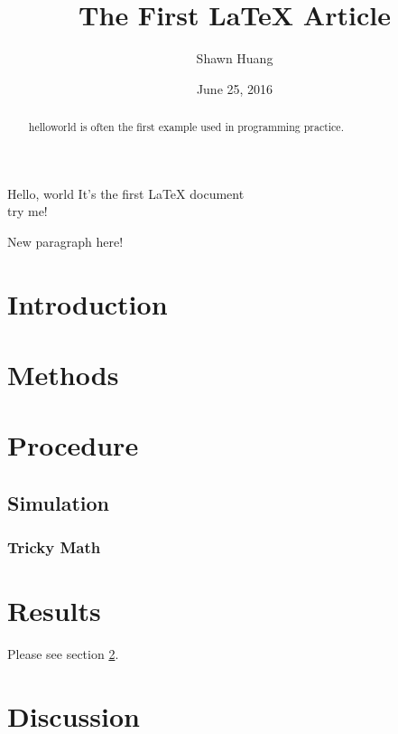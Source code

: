 \documentclass{article} %
\author{Shawn Huang}
\title{The First LaTeX Article}
\date{June 25, 2016}
\begin{document}
\maketitle %
\newpage %


\begin{abstract}
helloworld is often the first example used in programming practice.
\end{abstract}


Hello, world
It's the first LaTeX document\\              %
try me!

New paragraph here! %



\section{Introduction}

\section{Methods}\label{sec:method}           %
\section{Procedure}
\subsection{Simulation}
\subsubsection{Tricky Math}

\section{Results}
Please see section \ref{sec:method}.          %
\section{Discussion}
\end{document}
